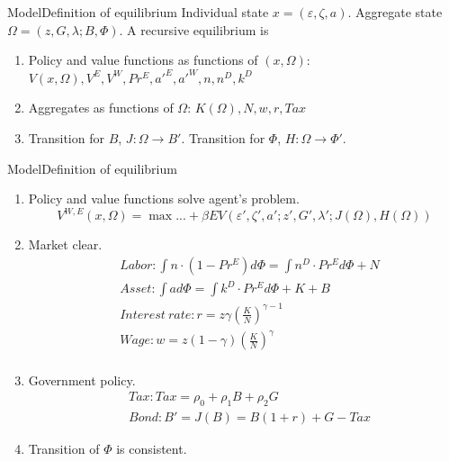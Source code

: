 \documentclass[svgnames]{beamer}
\begin{document}
\begin{frame}{Model}{Definition of equilibrium}
Individual state $x=(\varepsilon,\zeta,a)$. Aggregate state $\Omega=(z,G,\lambda;B,\Phi)$.
A recursive equilibrium is
\begin{enumerate}
\item Policy and value functions as functions of $(x,\Omega)$: $V(x,\Omega),V^E,V^W,Pr^E,a'^E,a'^W,n,n^D,k^D$
\item Aggregates as functions of $\Omega$: $K(\Omega),N,w,r,Tax$
\item Transition for $B$, $J:\Omega \rightarrow B'$. Transition for $\Phi$, $H: \Omega \rightarrow \Phi'$.
\end{enumerate}
\end{frame}
\begin{frame}{Model}{Definition of equilibrium}
\begin{enumerate}
\item Policy and value functions solve agent's problem.
$$V^{W,E}(x,\Omega) = \max ...
 +\beta EV(\varepsilon',\zeta',a';z',G',\lambda';J(\Omega),H(\Omega))$$
\item Market clear.
$$
\begin{aligned}
& Labor: \int n\cdot (1-Pr^E) d\Phi = \int n^D\cdot Pr^E d\Phi + N \\
& Asset: \int a d\Phi = \int k^D\cdot Pr^E d\Phi + K + B \\
& Interest \ rate: r = z \gamma (\frac{K}{N})^{\gamma-1} \\
& Wage: w = z(1-\gamma) (\frac{K}{N})^{\gamma} \\
\end{aligned}
$$
\item Government policy.
$$
\begin{aligned}
& Tax: Tax=\rho_0 + \rho_1 B + \rho_2 G \\
& Bond: B' = J(B) = B(1+r) + G - Tax
\end{aligned}
$$
\item Transition of $\Phi$ is consistent.
\end{enumerate}
\end{frame}
\end{document}
